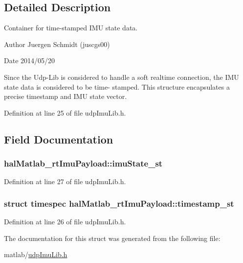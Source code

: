 \subsection{Detailed Description}
Container for time-\/stamped I\+M\+U state data. 



 \begin{DoxyAuthor}{Author}
Juergen Schmidt (juscgs00) 
\end{DoxyAuthor}
\begin{DoxyDate}{Date}
2014/05/20
\end{DoxyDate}
Since the Udp-\/\+Lib is considered to handle a soft realtime connection, the I\+M\+U state data is considered to be time-\/ stamped. This structure encapsulates a precise timestamp and I\+M\+U state vector.

Definition at line 25 of file udp\+Imu\+Lib.\+h.



\subsection{Field Documentation}
\hypertarget{structhalMatlab__rtImuPayload_a9c79ff85291d3492b09536e902c96c92_a9c79ff85291d3492b09536e902c96c92}{
\subsubsection[{imu\+State\+\_\+st}]{ hal\+Matlab\+\_\+rt\+Imu\+Payload\+::imu\+State\+\_\+st}}\label{structhalMatlab__rtImuPayload_a9c79ff85291d3492b09536e902c96c92_a9c79ff85291d3492b09536e902c96c92}


Definition at line 27 of file udp\+Imu\+Lib.\+h.

\hypertarget{structhalMatlab__rtImuPayload_a884897c9695ab0e4d2d0fbe9677a60cd_a884897c9695ab0e4d2d0fbe9677a60cd}{
\subsubsection[{timestamp\+\_\+st}]{\setlength{\rightskip}{0pt plus 5cm}struct timespec hal\+Matlab\+\_\+rt\+Imu\+Payload\+::timestamp\+\_\+st}}\label{structhalMatlab__rtImuPayload_a884897c9695ab0e4d2d0fbe9677a60cd_a884897c9695ab0e4d2d0fbe9677a60cd}


Definition at line 26 of file udp\+Imu\+Lib.\+h.



The documentation for this struct was generated from the following file\+:\begin{DoxyCompactItemize}
\item 
matlab/\hyperlink{udpImuLib_8h}{udp\+Imu\+Lib.\+h}\end{DoxyCompactItemize}
